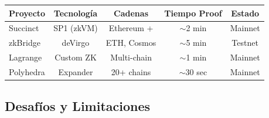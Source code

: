 \documentclass[11pt,a4paper,twoside]{book}
\begin{document}
\begin{center}
\begin{tabular}{lcccc}
\toprule
\textbf{Proyecto} & \textbf{Tecnolog\'ia} & \textbf{Cadenas} & \textbf{Tiempo Proof} & \textbf{Estado} \\
\midrule
Succinct & SP1 (zkVM) & Ethereum + & $\sim$2 min & Mainnet \\
zkBridge & deVirgo & ETH, Cosmos & $\sim$5 min & Testnet \\
Lagrange & Custom ZK & Multi-chain & $\sim$1 min & Mainnet \\
Polyhedra & Expander & 20+ chains & $\sim$30 sec & Mainnet \\
\bottomrule
\end{tabular}
\end{center}

\subsection{Desaf\'ios y Limitaciones}
\end{document}
